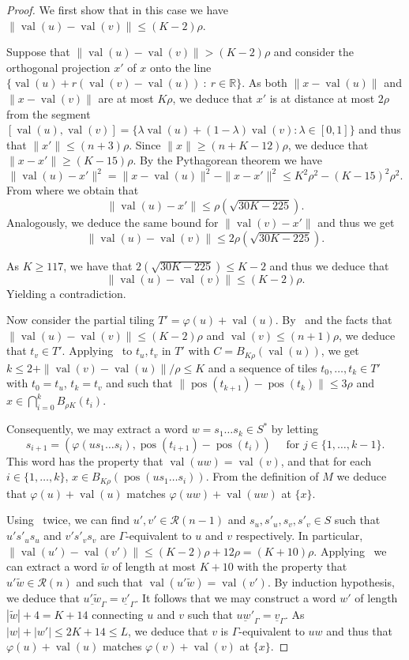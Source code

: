 \documentclass{article}
\theoremstyle{definition}
\theoremstyle{definition}
\newcommand{\R}{\mathbb{R}}
\newcommand{\norm}[1]{\|{#1}\|}
\newcommand{\val}{\operatorname{val}}
\newcommand{\pos}{\operatorname{pos}}
\begin{document}
    \begin{proof}
    We first show that in this case we have $\norm{\val(u)-\val(v)}\leq (K-2)\rho$.
    
    Suppose that $\norm{\val(u)-\val(v)}> (K-2)\rho$ and consider the orthogonal projection $x'$ of $x$ onto the line $\{\val(u) + r(\val(v)-\val(u)) \ : \ r\in \R\}$. As both $\norm{x-\val(u)}$ and $\norm{x-\val(v)}$ are at most $K\rho$, we deduce that $x'$ is at distance at most $2\rho$ from the segment $[\val(u),\val(v)] = \{ \lambda \val(u) + (1-\lambda)\val(v) : \lambda \in [0,1]\}$ and thus that $\norm{x'} \leq (n+3)\rho$. Since $\norm{x}\geq (n+K-12)\rho$, we deduce that $\norm{x-x'}\geq (K-15)\rho$. By the Pythagorean theorem we have \[ \norm{\val(u)-x'}^2 = \norm{x-\val(u)}^2 -\norm{x-x'}^2 \leq K^2\rho^2 - (K-15)^2\rho^2.    \]
    From where we obtain that \[  \norm{\val(u)-x'} \leq \rho( \sqrt{30K-225}). \]
    Analogously, we deduce the same bound for $\norm{\val(v)-x'}$ and thus we get \[ \norm{\val(u)-\val(v)} \leq 2\rho( \sqrt{30K-225}).  \]

    As $K \geq 117$, we have that $2( \sqrt{30K-225})\leq K-2$ and thus we deduce that \[ \norm{\val(u)-\val(v)} \leq (K-2)\rho.  \]
    Yielding a contradiction.

    Now consider the partial tiling $T'=\varphi(u)+\val(u)$. By~ and the facts that $\norm{\val(u)-\val(v)} \leq (K-2)\rho$ and $\val(v)\leq (n+1)\rho$, we deduce that $t_v \in T'$. Applying~ to $t_u,t_v$ in $T'$ with $C=B_{K\rho}(\val(u))$, we get $k \leq 2+ \norm{\val(v)-\val(u)}/\rho \leq K$ and a sequence of tiles $t_0,\dots, t_k\in T'$ with $t_0=t_u$, $t_k = t_v$ and such that $\norm{\pos(t_{k+1})-\pos(t_k)}\leq 3\rho$ and $x \in \bigcap_{i=0}^k B_{\rho K}(t_i)$. 
    
    Consequently, we may extract a word $w=s_1\dots s_k \in S^*$ by letting  \[s_{i+1} = (\varphi(us_1 \dots s_{i}),\pos(t_{i+1})-\pos(t_i)) \quad \mbox{ for } j \in \{1,\dots,k-1\}.\] 
    This word has the property that $\val(uw) = \val(v)$, and that for each $i\in \{1,\dots,k\}$, $x \in B_{K\rho}(\pos(u s_1\dots s_i))$. From the definition of $M$ we deduce that $\varphi(u)+\val(u)$ matches $\varphi(uw)+\val(uw)$ at $\{x\}$.

    Using~ twice, we can find $u',v'\in \mathcal{R}(n-1)$ and $s_u,s'_u,s_v,s'_v \in S$ such that $u's'_us_u$ and $v's'_vs_v$ are $\Gamma$-equivalent to $u$ and $v$ respectively. In particular, $\norm{\val(u')-\val(v')}\leq (K-2)\rho+12\rho = (K+10)\rho$. Applying~ we can extract a word $\tilde{w}$ of length at most $K+10$ with the property that $u'\tilde{w}\in \mathcal{R}(n)$ and such that $\val(u'\tilde{w})=\val(v')$. By induction hypothesis, we deduce that $\underline{u'\tilde{w}}_{\Gamma} = \underline{v'}_{\Gamma}$. It follows that we may construct a word $w'$ of length $|\tilde{w}|+4=K+14$ connecting $u$ and $v$ such that $\underline{uw'}_\Gamma =\underline{v}_{\Gamma}$. As $|w|+|w'|\leq 2K+14 \leq L$, we deduce that $v$ is $\Gamma$-equivalent to $uw$ and thus that $\varphi(u)+\val(u)$ matches $\varphi(v)+\val(v)$ at $\{x\}$.\end{proof}
\end{document}
